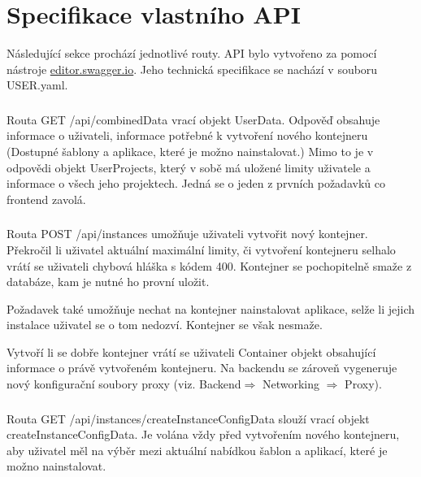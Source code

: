 \documentclass[a4paper,oneside,12pt]{report}
\begin{document}
\section{Specifikace vlastního API}

Následující sekce prochází jednotlivé routy.
API bylo vytvořeno za pomocí nástroje \url{editor.swagger.io}.
Jeho technická specifikace se nachází v souboru USER.yaml.


\subsubsection{\color{apiblue}{GET -- /api/combinedData}}

Routa GET /api/combinedData vrací objekt UserData.
Odpověď obsahuje informace o uživateli, informace potřebné k vytvoření nového kontejneru (Dostupné šablony a aplikace, které je možno nainstalovat.)
Mimo to je v odpovědi objekt UserProjects, který v sobě má uložené limity uživatele a informace o všech jeho projektech.
Jedná se o jeden z prvních požadavků co frontend zavolá.

\subsubsection{\color{apiblue}{POST -- /api/instances}}

Routa POST /api/instances umožňuje uživateli vytvořit nový kontejner.
Překročil li uživatel aktuální maximální limity, či vytvoření kontejneru selhalo vrátí se uživateli chybová hláška s kódem 400.
Kontejner se pochopitelně smaže z databáze, kam je nutné ho provní uložit.

Požadavek také umožňuje nechat na kontejner nainstalovat aplikace, selže li jejich instalace uživatel se o tom nedozví.
Kontejner se však nesmaže.

Vytvoří li se dobře kontejner vrátí se uživateli Container objekt obsahující informace o právě vytvořeném kontejneru.
Na backendu se zároveň vygeneruje nový konfigurační soubory proxy (viz. Backend$\Rightarrow$ Networking $\Rightarrow$ Proxy).


\subsubsection{\color{apiblue}{GET -- /api/instances/createInstanceConfigData}}

Routa GET /api/instances/createInstanceConfigData slouží vrací objekt createInstanceConfigData.
Je volána vždy před vytvořením nového kontejneru, aby uživatel měl na výběr mezi aktuální nabídkou šablon a aplikací, které je možno nainstalovat.
\end{document}
